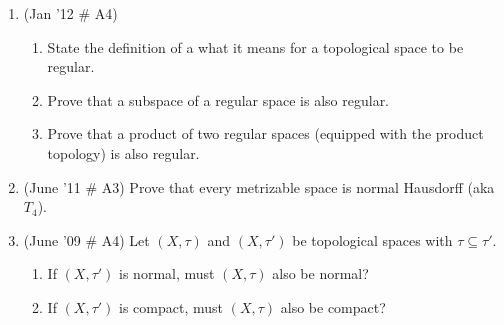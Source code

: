 \documentclass[psamsfonts, 11pt, reqno]{amsart}
\begin{document}
\begin{enumerate}
\vfill

\item (Jan '12 \# A4)
\begin{enumerate}
\item State the definition of a what it means for a topological space to be regular.
\item Prove that a subspace of a regular space is also regular.
\item Prove that a product of two regular spaces (equipped with the product topology) is also regular.

\end{enumerate}
\vfill 

\item (June '11 \# A3) Prove that every metrizable space is normal Hausdorff (aka $T_4$).

\vfill

\item (June '09 \# A4) Let $(X, \tau)$ and $(X, \tau ')$ be topological spaces with $\tau \subseteq \tau '$.
\begin{enumerate}
\item If $(X, \tau ')$ is normal, must $(X, \tau)$ also be normal?
\item If $(X, \tau ')$ is compact, must $(X, \tau)$ also be compact?
\end{enumerate}


\end{enumerate}
\end{document}
